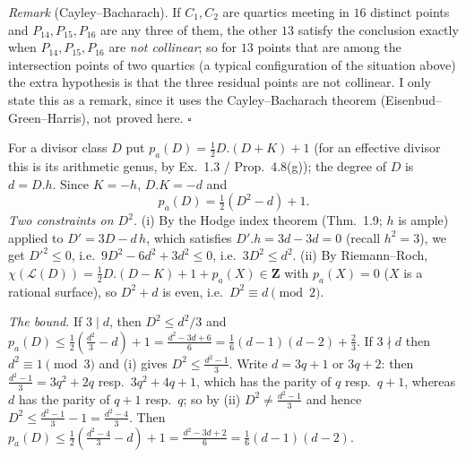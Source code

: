 \documentclass[11pt]{article}
\begin{document}
\emph{Remark} (Cayley--Bacharach). If $C_1,C_2$ are quartics meeting in $16$ distinct points and $P_{14},P_{15},P_{16}$ are any three of them, the other $13$ satisfy the conclusion exactly when $P_{14},P_{15},P_{16}$ are \emph{not collinear}; so for $13$ points that are among the intersection points of two quartics (a typical configuration of the situation above) the extra hypothesis is that the three residual points are not collinear. I only state this as a remark, since it uses the Cayley--Bacharach theorem (Eisenbud--Green--Harris), not proved here. \hfill$\square$

\pf
For a divisor class $D$ put $p_a(D)=\frac12D.(D+K)+1$ (for an effective divisor this is its arithmetic genus, by Ex.~1.3 / Prop.~4.8(g)); the degree of $D$ is $d=D.h$. Since $K=-h$, $D.K=-d$ and
\[
p_a(D)=\tfrac12(D^2-d)+1 .
\]
\emph{Two constraints on $D^2$.} (i) By the Hodge index theorem (Thm.~1.9; $h$ is ample) applied to $D'=3D-d\,h$, which satisfies $D'.h=3d-3d=0$ (recall $h^2=3$), we get $D'^2\le0$, i.e.\ $9D^2-6d^2+3d^2\le0$, i.e.\ $3D^2\le d^2$. (ii) By Riemann--Roch, $\chi(\mathcal L(D))=\frac12D.(D-K)+1+p_a(X)\in\mathbf Z$ with $p_a(X)=0$ ($X$ is a rational surface), so $D^2+d$ is even, i.e.\ $D^2\equiv d\pmod2$.

\emph{The bound.} If $3\mid d$, then $D^2\le d^2/3$ and $p_a(D)\le\frac12(\frac{d^2}3-d)+1=\frac{d^2-3d+6}{6}=\frac16(d-1)(d-2)+\frac23$. If $3\nmid d$ then $d^2\equiv1\pmod 3$ and (i) gives $D^2\le\frac{d^2-1}3$. Write $d=3q+1$ or $3q+2$: then $\frac{d^2-1}3=3q^2+2q$ resp.\ $3q^2+4q+1$, which has the parity of $q$ resp.\ $q+1$, whereas $d$ has the parity of $q+1$ resp.\ $q$; so by (ii) $D^2\neq\frac{d^2-1}{3}$ and hence $D^2\le\frac{d^2-1}3-1=\frac{d^2-4}3$. Then $p_a(D)\le\frac12(\frac{d^2-4}3-d)+1=\frac{d^2-3d+2}6=\frac16(d-1)(d-2)$.
\end{document}
